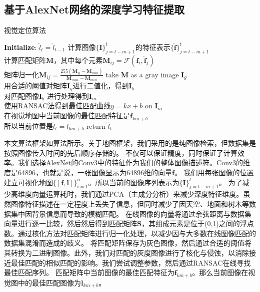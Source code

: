 \subsection{基于AlexNet网络的深度学习特征提取}
\begin{algorithm} 
 \caption{视觉定位算法}
 \textbf{Initialize}: $\hat{l}_t = \hat{l}_{t-1}$
  { 计算图像$\{\mathbf{I}\}_{j=t-m+1}^{t}$的特征表示$\{\mathbf{\hat{f}}\}_{j=t-m+1}^{t}$  \\
    计算匹配矩阵$\mathbf{M}$，其中每个元素$\mathbf{M}_{ij}=\mathcal{F}(\mathbf{f}_i,\mathbf{\hat{f}}_j)$   \\
    矩阵归一化$\mathbf{M}_{ij}=\frac{255\left(\mathbf{M}_{ij}-\mathbf{M}_{min}\right)}{\mathbf{M}_{max}-\mathbf{M}_{min}}$ take $\mathbf{M}$ as a gray image $\mathbf{I}_g$\\
    用合适的阈值对矩阵$\mathbf{I}_g$进行二值化，得到$\mathbf{I}_b$\\
    对匹配图像$\mathbf{I}_b$ 进行处理得到$\mathbf{I}_m$\\
    使用RANSAC法得到最佳匹配曲线$y=kx+b$ on $\mathbf{I}_m$ \\
    在视觉地图中当前图像的最佳匹配特征是$\mathbf{f}_{km+b}$\\
    所以当前位置是$\hat{l}_t = l_{km+b} $
 }
 return $\hat{l}_t$
  \label{alg:Algorithm}
\end{algorithm}

本文算法框架如算法\label{fig:Framework}所示。关于地图框架，我们采用的是纯图像检索，但数据集是按照图像传入时间的先后顺序存储的。
不仅可以保证精度，同时保证了计算效率。我们选择AlexNet的Conv3中的特征作为我们的整体图像描述符。Conv3的维度是64896，也就是说，一张图像显示为64896维的向量$\mathbf{f}$。
我们用每张图像的位置建立可视化地图$\{[\mathbf{f},\mathbf{l}]\}_{i=1}^{n}$。所以当前的图像序列表示为$\{\mathbf{I}\}_{j=t-m+1}^{t}$。
为了减少高维度向量运算耗时，我们通过PCA（主成分分析）来减少深度特征维度。虽然图像特征描述在一定程度上丢失了信息，但同时减少了因天空、地面和树木等数据集中因背景信息而导致的模糊匹配。
在线图像的向量将通过余弦距离与数据集向量进行逐一比较，然后然后得到匹配矩阵$\mathbf{S}$，其组成元素是位于(0,1)之间的浮点数。通过核化方法对匹配矩阵进行归一化处理，以减少因与大多数在线图像匹配的数据集混淆而造成的歧义。
将匹配矩阵保存为灰色图像，然后通过合适的阈值将其转换为二进制图像。此外，我们对匹配的灰度图像进行了核化与侵蚀，以消除接近最佳匹配的相似匹配的影响。我们尝试调整参数，然后通过RANSAC在线寻找最佳匹配序列。
匹配矩阵中当前图像的最佳匹配特征为$\mathbf{f}_{km+b}$。那么当前图像在视觉图中的最佳匹配图像为$\mathbf{l}_{km+b}$。

